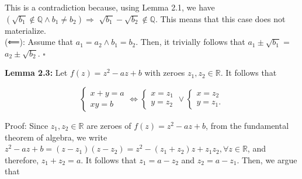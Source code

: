 \documentclass[11pt,letterpaper]{article}
\begin{document}
This is a contradiction because, using Lemma 2.1, we have $\left(\sqrt{b_{1}} \notin \mathbb{Q} \wedge b_{1} \neq b_{2}\right) \Longrightarrow$ $\sqrt{b_1}-\sqrt{b_{2}} \notin \mathbb{Q}$. This means that this case does not materialize.\\
(⟸): Assume that $a_{1}=a_{2} \wedge b_{1}=b_{2}$. Then, it trivially follows that $a_{1} \pm \sqrt{b_{1}}=$ $a_{2} \pm \sqrt{b_{2}}$. \(\square\)

\noindent\textbf{Lemma 2.3:} Let $f(z)=z^{2}-a z+b$ with zeroes $z_{1}, z_{2} \in \mathbb{R}$. It follows that

\[
\left\{\begin{array} { l } 
{ x + y = a } \\
{ x y = b }
\end{array} \Longleftrightarrow \left\{\begin{array} { l } 
{ x = z _ { 1 } } \\
{ y = z _ { 2 } }
\end{array} \vee \left\{\begin{array}{l}
x=z_{2} \\
y=z_{1} .
\end{array}\right.\right.\right.
\]

Proof: Since $z_{1}, z_{2} \in \mathbb{R}$ are zeroes of $f(z)=z^{2}-a z+b$, from the fundamental theorem of algebra, we write $z^{2}-a z+b=\left(z-z_{1}\right)\left(z-z_{2}\right)=z^{2}-\left(z_{1}+z_{2}\right) z+z_{1} z_{2}, \forall z \in \mathbb{R}$, and therefore, $z_{1}+z_{2}=a$. It follows that $z_{1}=a-z_{2}$ and $z_{2}=a-z_{1}$. Then, we argue that
\end{document}

